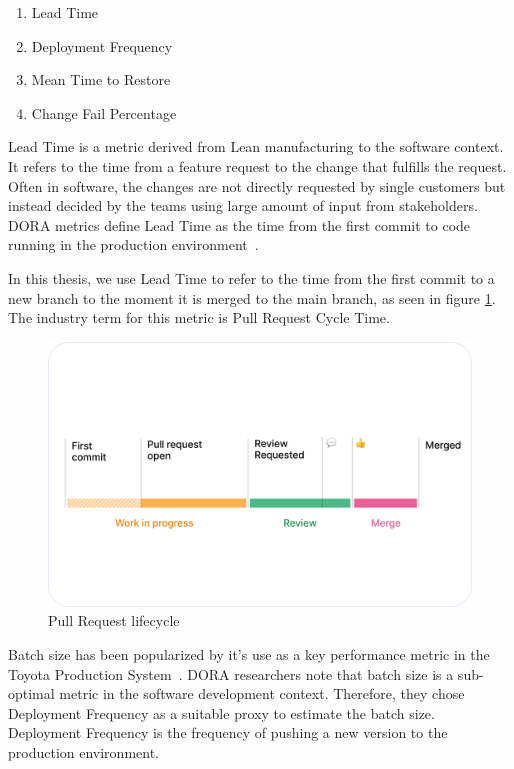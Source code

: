 \begin{enumerate}
\item Lead Time
\item Deployment Frequency
\item Mean Time to Restore
\item Change Fail Percentage
\end{enumerate}

Lead Time is a metric derived from Lean manufacturing to the software context. It refers to the time from a feature request to the change that fulfills the request. Often in software, the changes are not directly requested by single customers but instead decided by the teams using large amount of input from stakeholders. DORA metrics define Lead Time as the time from the first commit to code running in the production environment~\cite{forsgren_accelerate_2018}.

In this thesis, we use Lead Time to refer to the time from the first commit to a new branch to the moment it is merged to the main branch, as seen in figure \ref{fig:CycleTime}. The industry term for this metric is Pull Request Cycle Time. 

\begin{figure}[ht]
    \begin{center}
        \includegraphics[width=13.5cm]{images/cycletime_defined}
        \caption{Pull Request lifecycle~\cite{swarmia_reducing_nodate}}
        \label{fig:CycleTime}
    \end{center}
\end{figure}

Batch size has been popularized by it's use as a key performance metric in the Toyota Production System~\cite{ono_toyota_1988}. DORA researchers note that batch size is a sub-optimal metric in the software development context. Therefore, they chose Deployment Frequency as a suitable proxy to estimate the batch size. Deployment Frequency is the frequency of pushing a new version to the production environment.  

